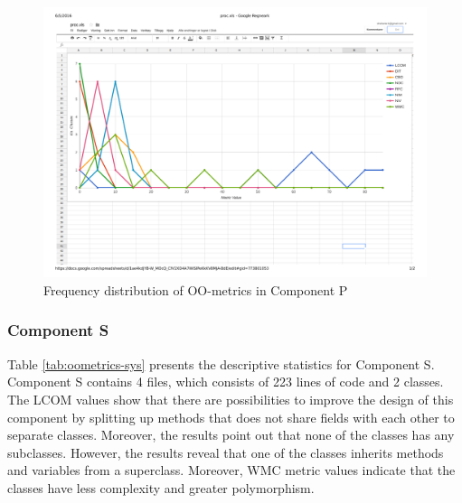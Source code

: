 \begin{landscape}
\setlength\LTleft{-.5in}
	\begin{figure}
	\centering
	\includegraphics[width=\textwidth]{images/pdf/process.pdf}
	\caption{Frequency distribution of OO-metrics in Component P}
	\label{fig:procgraph}
	\end{figure}
\end{landscape}



\subsubsection{Component S}
Table \ref{tab:oometrics-sys} presents the descriptive statistics for Component S. Component S contains 4 files, which consists of 223 lines of code and 2 classes. The LCOM values show that there are possibilities to improve the design of this component by splitting up methods that does not share fields with each other to separate classes. Moreover, the results point out that none of the classes has any subclasses. However, the results reveal that one of the classes inherits methods and variables from a superclass. Moreover, WMC metric values indicate that the classes have less complexity and greater polymorphism.

